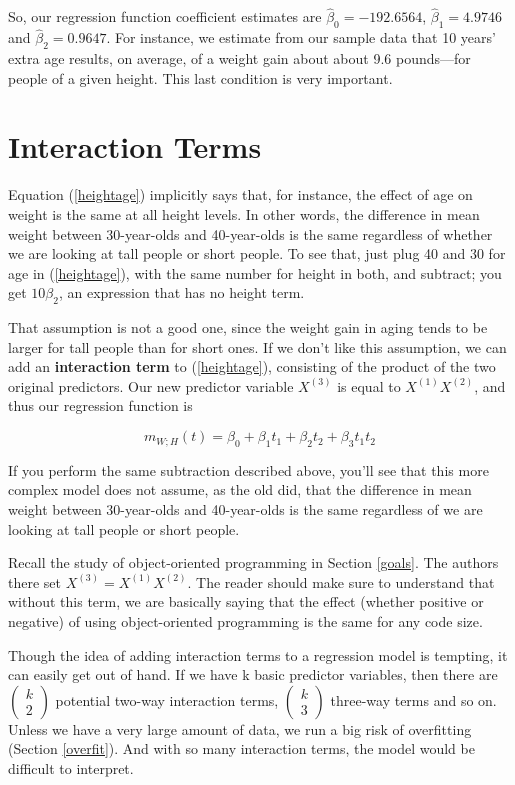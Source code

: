 So, our regression function coefficient estimates are
$\hat{\beta}_0 = -192.6564$,
$\hat{\beta}_1 = 4.9746$ and
$\hat{\beta}_2 = 0.9647$.
For instance, we estimate from our sample data that
10 years' extra age results, on average, of a weight gain about about
9.6 pounds---for people of a given height.  This last condition is very
important.

\section{Interaction Terms}
\label{interaction}

Equation (\ref{heightage}) implicitly says that, for instance, the
effect of age on weight is the same at all height levels.  In other
words, the difference in mean weight between 30-year-olds and
40-year-olds is the same regardless of whether we are looking at tall
people or short people.  To see that, just plug 40 and 30 for age in
(\ref{heightage}), with the same number for height in both, and
subtract; you get $10 \beta_2$, an expression that has no height term.

That assumption is not a good one, since the weight gain in aging
tends to be larger for tall people than for short ones.  If we don't
like this assumption, we can add an {\bf interaction term} to
(\ref{heightage}), consisting of the product of the two original
predictors.  Our new predictor variable $X^{(3)}$ is equal to $X^{(1)}
X^{(2)}$, and thus our regression function is

\begin{equation}
\label{heightage2}
m_{W;H}(t) = \beta_0 + \beta_1 t_1 + \beta_2 t_2 + \beta_3 t_1 t_2
\end{equation}

If you perform the same subtraction described above, you'll see that
this more complex model does not assume, as the old did, that the
difference in mean weight between 30-year-olds and 40-year-olds is the
same regardless of we are looking at tall people or short people.  

Recall the study of object-oriented programming in Section \ref{goals}.
The authors there set $X^{(3)} = X^{(1)} X^{(2)}$.  The reader should
make sure to understand that without this term, we are basically saying
that the effect (whether positive or negative) of using object-oriented
programming is the same for any code size.

Though the idea of adding interaction terms to a regression model is
tempting, it can easily get out of hand.  If we have k basic predictor
variables, then there are 
$ 
\left ( 
\begin{array}{c} 
k \\ 
2 
\end{array}
\right )
$
potential two-way interaction terms, 
$ 
\left ( 
\begin{array}{c} 
k \\ 
3
\end{array}
\right )
$ three-way terms and so on.  Unless we have a very large amount of data, 
we run a big risk of overfitting (Section \ref{overfit}).  And with 
so many interaction terms, the model would be difficult to interpret.

